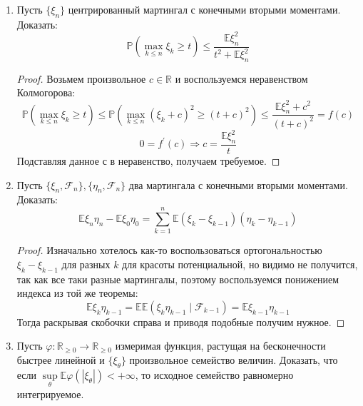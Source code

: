 \documentclass[12pt,a4paper]{article} %
\newcommand{\R}{\mathbb{R}}
\newcommand{\E}{\mathbb{E}}
\newcommand{\PR}{\mathbb{P}}
\newcommand{\F}{\mathcal{F}}
\begin{document}
\begin{enumerate}
		\begin{proof}
			Измеримость очевидна. Покажем субмартингальное свойство, а именно для любого $A\in\F_n$ докажем:
			$$\int\limits_A\E(\zeta_{n+1}\mid\F_n)d\PR\geq\int\limits_A\zeta_nd\PR$$
			Заметим, что интересны только случаи, когда на множестве $A$ (п.н.) выполнены соотношения:
			$$\xi_{n+1}\geq\eta_{n+1},\quad\eta_n\geq\xi_n$$
			и случай с неравенствами в другие стороны, так как в других случаях множество $A$ очевидно разбиваются на 4 дизъюнктных множества с соответствующими неравенствами, 2 из которых очевидно верны из условия субмартингальности. Докажем, что при выполнении таких неравенств будет верно интегральное неравенство. Для этого вспомним:
			$$\xi\geq\eta \,\,\emph{на}\,\, A\Rightarrow\E(\xi\mid\F)\geq\E(\eta\mid\F)\,\,\emph{на}\,\, A$$
			Тогда из субмартингальности величин и при неравенствах на них в нашем случае получаем:
			$$\int\limits_A\E(\zeta_{n+1}\mid\F_n)d\PR=\int\limits_A\E(\xi_{n+1}\mid\F_n)d\PR\geq\int\limits_A\E(\eta_{n+1}\mid\F_n)d\PR\geq\int\limits_A\eta_nd\PR=\int\limits_A\zeta_nd\PR$$
		\end{proof}
		\item Пусть $\{\xi_n\}$ центрированный мартингал с конечными вторыми моментами. Доказать:
		$$\PR(\max\limits_{k\leq n}\xi_k\geq t)\leq\frac{\E\xi_n^2}{t^2+\E\xi_n^2}$$
		\begin{proof}
			Возьмем произвольное $c\in\R$ и воспользуемся неравенством Колмогорова:
			$$\PR(\max\limits_{k\leq n}\xi_k\geq t)\leq\PR(\max\limits_{k\leq n}(\xi_k+c)^2\geq (t+c)^2)\leq\frac{\E\xi_n^2+c^2}{(t+c)^2}=f(c)$$
			$$0=f^{'}(c)\Rightarrow c=\frac{\E\xi_n^2}{t}$$
			Подставляя данное с в неравенство, получаем требуемое.
		\end{proof}
		\item Пусть $\{\xi_n,\F_n\},\{\eta_n,\F_n\}$ два мартингала с конечными вторыми моментами. Доказать:
		$$\E\xi_n\eta_n-\E\xi_0\eta_0=\sum_{k=1}^n\E(\xi_k-\xi_{k-1})(\eta_k-\eta_{k-1})$$
		\begin{proof}
			Изначально хотелось как-то воспользоваться ортогональностью $\xi_k-\xi_{k-1}$ для разных $k$ для красоты потенциальной, но видимо не получится, так как все таки разные мартингалы, поэтому воспользуемся понижением индекса из той же теоремы:
			$$\E\xi_k\eta_{k-1}=\E\E(\xi_k\eta_{k-1}\mid\F_{k-1})=\E\xi_{k-1}\eta_{k-1}$$
			Тогда раскрывая скобочки справа и приводя подобные получим нужное.
		\end{proof}
		\item Пусть $\varphi:\R_{\geq0}\rightarrow\R_{\geq0}$ измеримая функция, растущая на бесконечности быстрее линейной и $\{\xi_{\theta}\}$ произвольное семейство величин. Доказать, что если $\sup\limits_{\theta}\E\varphi(|\xi_{\theta}|)<+\infty$, то исходное семейство равномерно интегрируемое.

\end{enumerate}
\end{document}
